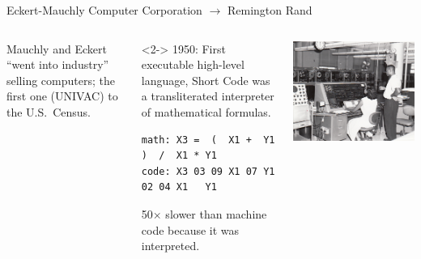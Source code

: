 \documentclass[aspectratio=169]{beamer}
\begin{document}
\begin{frame}[fragile]{Eckert-Mauchly Computer Corporation $\to$ Remington Rand}
\vspace{0.5 cm}

\begin{columns}
Mauchly and Eckert ``went into industry'' selling computers; the first one (UNIVAC) to the U.S.\ Census.

\vspace{0.5 cm}
\begin{uncoverenv}<2->
1950: First executable high-level language, Short Code was a transliterated interpreter of mathematical formulas.
\begin{center}
\small
\vspace{-0.1 cm}
\begin{minipage}{0.8\linewidth}
\begin{verbatim}
math: X3 =  (  X1 +  Y1 )  /  X1 * Y1
code: X3 03 09 X1 07 Y1 02 04 X1   Y1
\end{verbatim}
\end{minipage}

\vspace{0.2 cm}
\normalsize
50$\times$ slower than machine code because it was interpreted.
\end{center}
\end{uncoverenv}

\vspace{0.5 cm}

\vspace{0.5 cm}

\includegraphics[width=\linewidth]{Univac_I_at_Census_Bureau_with_two_operators.jpg}


\end{columns}
\end{frame}
\end{document}

